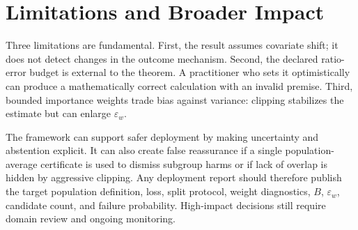 \section{Limitations and Broader Impact}
\label{sec:limitations}

Three limitations are fundamental.  First, the result assumes covariate shift; it
does not detect changes in the outcome mechanism.  Second, the declared ratio-error
budget is external to the theorem.  A practitioner who sets it optimistically can
produce a mathematically correct calculation with an invalid premise.  Third,
bounded importance weights trade bias against variance: clipping stabilizes the
estimate but can enlarge $\varepsilon_w$.

The framework can support safer deployment by making uncertainty and abstention
explicit.  It can also create false reassurance if a single population-average
certificate is used to dismiss subgroup harms or if lack of overlap is hidden by
aggressive clipping.  Any deployment report should therefore publish the target
population definition, loss, split protocol, weight diagnostics, $B$,
$\varepsilon_w$, candidate count, and failure probability.  High-impact decisions
still require domain review and ongoing monitoring.
